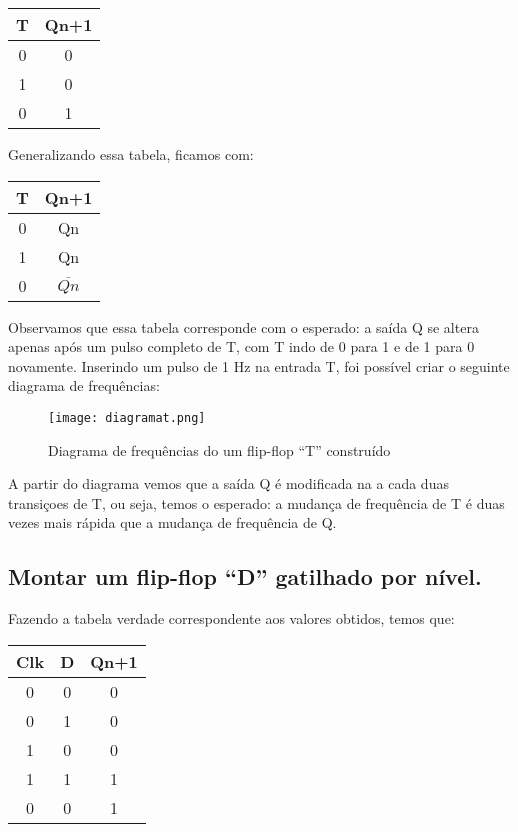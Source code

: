 \documentclass[12pt]{article}
\begin{document}
\begin{table}[H]
	\centering
	\begin{tabular}{|c|c|}
		\cline{1-2}
		\multicolumn{1}{|c|}{T} & \multicolumn{1}{|c|}{Qn+1} \\
		\hline
		0 & 0 \\
		\hline
		1 & 0\\
		\hline
		0 & 1\\
		\hline
	\end{tabular}
	
\end{table} 

Generalizando essa tabela, ficamos com:

\begin{table}[H]
	\centering
	\begin{tabular}{|c|c|}
		\cline{1-2}
		\multicolumn{1}{|c|}{T} & \multicolumn{1}{|c|}{Qn+1} \\
		\hline
		0 & Qn \\
		\hline
		1 & Qn\\
		\hline
		0 & $\overline{Qn}$\\
		\hline
	\end{tabular}
	
\end{table} 

Observamos que essa tabela corresponde com o esperado: a saída Q se altera apenas após um pulso completo de T, com T indo de 0 para 1 e de 1 para 0 novamente. Inserindo um pulso de 1 Hz na entrada T, foi possível criar o seguinte diagrama de frequências:

\begin{figure}[H]
	\centering
	\texttt{[image: diagramat.png]}
	\caption{Diagrama de frequências do um flip-flop “T” construído}
	\label{fig:diagramat}
\end{figure}

A partir do diagrama vemos que a saída Q é modificada na a cada duas transiçoes de T, ou seja, temos o esperado: a mudança de frequência de T é duas vezes mais rápida que a mudança de frequência de Q.

\subsection{Montar um flip-flop “D” gatilhado por nível.}

Fazendo a tabela verdade correspondente aos valores obtidos, temos que:

\begin{table}[H]
	\centering
	\begin{tabular}{|c|c|c|}
		\cline{1-3}
		\multicolumn{1}{|c|}{Clk} & \multicolumn{1}{|c|}{D} & \multicolumn{1}{|c|}{Qn+1} \\
		\hline
		0 & 0 & 0 \\
		\hline
		0 & 1 & 0 \\
		\hline
		1 & 0 & 0 \\
		\hline
		1 & 1 & 1 \\
		\hline
		0 & 0 & 1 \\
		\hline
	\end{tabular}
\end{table}
\end{document}
